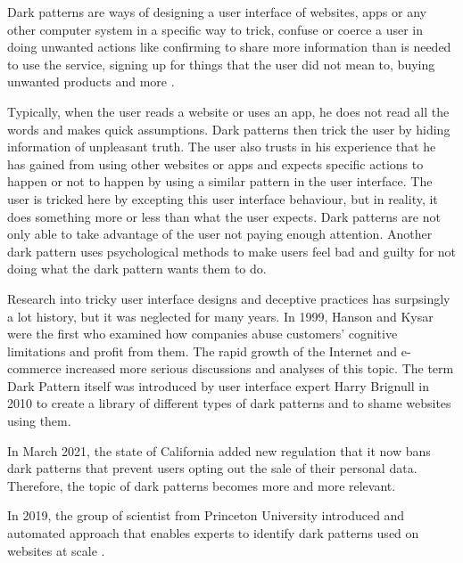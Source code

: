 Dark patterns \cite{dark-patterns-brignull}\cite{dark-patterns-colin}\cite{the-year-dark-pattern-won}\cite{dark-patterns-at-scale} are ways of designing a user interface of websites, apps or any other computer system in a specific way to trick, confuse or coerce a user in doing unwanted actions like confirming to share more information than is needed to use the service, signing up for things that the user did not mean to, buying unwanted products and more .  

Typically, when the user reads a website or uses an app, he does not read all the words and makes quick assumptions\cite{dark-patterns-brignull}. Dark patterns then trick the user by hiding information of unpleasant truth. The user also trusts in his experience that he has gained from using other websites or apps and expects specific actions to happen or not to happen by using a similar pattern in the user interface. The user is tricked here by excepting this user interface behaviour, but in reality, it does something more or less than what the user expects\cite{the-year-dark-pattern-won}. Dark patterns are not only able to take advantage of the user not paying enough attention. Another dark pattern uses psychological methods to make users feel bad and guilty for not doing what the dark pattern wants them to do\cite{the-year-dark-pattern-won}.

Research into tricky user interface designs and deceptive practices has surpsingly a lot history, but it was neglected for many years. In 1999, Hanson and Kysar were the first who examined how companies abuse customers' cognitive limitations and profit from them\cite{kysar-douglas}. The rapid growth of the Internet and e-commerce increased more serious discussions and analyses of this topic. The term Dark Pattern itself was introduced by user interface expert Harry Brignull in 2010 to create a library of different types of dark patterns and to shame websites using them\cite{dark-patterns-brignull-about-us}. 


In March 2021, the state of California added new regulation that it now bans dark patterns that prevent users opting out the sale of their personal data\cite{california-bans-dark-patterns}. Therefore, the topic of dark patterns becomes more and more relevant.


In 2019, the group of scientist from Princeton University introduced and automated approach that enables experts to identify dark patterns used on websites at scale \cite{dark-patterns-at-scale}. 

